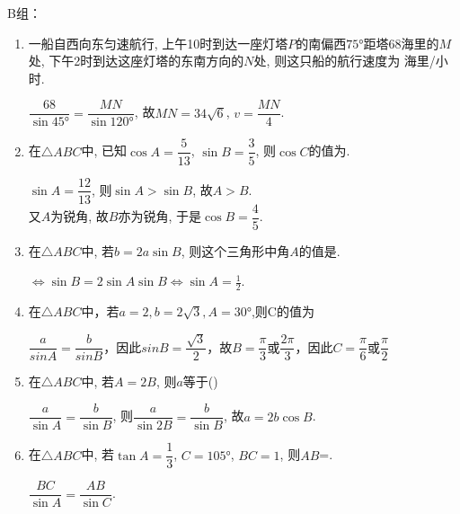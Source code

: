 B组：
\begin{enumerate}

\item 一船自西向东匀速航行, 上午10时到达一座灯塔$P$的南偏西$\ang{75}$距塔68海里的$M$处, 下午2时到达这座灯塔的东南方向的$N$处, 
则这只船的航行速度为 海里/小时. 
\begin{jieda}
$\dfrac{68}{\sin\ang{45}}=\dfrac{MN}{\sin\ang{120}}$, 故$MN=34\sqrt{6}$, $v=\dfrac{MN}{4}$. 
\end{jieda}

\item 在$\triangle{ABC}$中, 已知$\cos{A}=\dfrac{5}{13}$, $\sin{B}=\dfrac{3}{5}$, 则$\cos{C}$的值为. 
\begin{jieda}
$\sin{A}=\dfrac{12}{13}$, 则$\sin{A}>\sin{B}$, 故$A>B$. \\
又$A$为锐角, 故$B$亦为锐角, 于是$\cos{B}=\dfrac{4}{5}$. 
\end{jieda}

\item 在$\triangle{ABC}$中, 若$b=2a\sin{B}$, 则这个三角形中角$A$的值是. 
\begin{jieda}
$\iff \sin{B}=2\sin{A}\sin{B}\iff \sin{A}=\frac{1}{2}$. 
\end{jieda}

\item 在$\triangle{ABC}$中，若$a=2,b=2\sqrt{3},A=\ang{30}$,则C的值为
\begin{jieda}
    $\dfrac{a}{sinA} = \dfrac{b}{sinB}$，因此$sinB = \dfrac{\sqrt{3}}{2}$，故$B = \dfrac{\pi}{3}$或$\dfrac{2\pi}{3}$，因此$C = $$\dfrac{\pi}{6}$或$\dfrac{\pi}{2}$
\end{jieda}


\item 在$\triangle{ABC}$中, 若$A=2B$, 则$a$等于\dotfill()
\begin{jieda}
$\dfrac{a}{\sin{A}}=\dfrac{b}{\sin{B}}$, 则$\dfrac{a}{\sin2B}=\dfrac{b}{\sin{B}}$, 故$a=2b\cos{B}$. 
\end{jieda}

\item 在$\triangle{ABC}$中, 若$\tan{A}=\dfrac{1}{3}$, $C=\ang{105}$, $BC=1$, 则$AB$=. 
\begin{jieda}
$\dfrac{BC}{\sin{A}}=\dfrac{AB}{\sin{C}}$. 
\end{jieda}



\end{enumerate}
